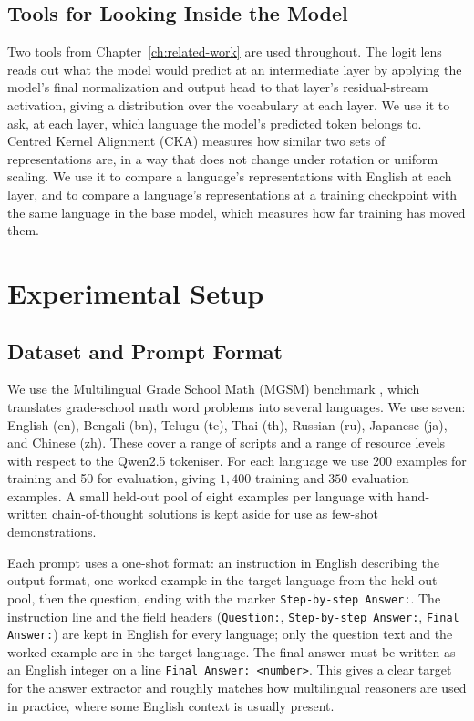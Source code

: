 \subsection{Tools for Looking Inside the Model}
\label{subsec:grpo-tools}

Two tools from Chapter~\ref{ch:related-work} are used throughout. The logit lens
\citep{nostalgebraist2020logitlens} reads out what the model would predict at an
intermediate layer by applying the model's final normalization and output head to
that layer's residual-stream activation, giving a distribution over the vocabulary
at each layer. We use it to ask, at each layer, which language the model's predicted
token belongs to. Centred Kernel Alignment (CKA)
\citep{kornblith2019similarity} measures how similar two sets of representations are,
in a way that does not change under rotation or uniform scaling. We use it to compare
a language's representations with English at each layer, and to compare a language's
representations at a training checkpoint with the same language in the base model,
which measures how far training has moved them.

\section{Experimental Setup}
\label{sec:grpo-setup}

\subsection{Dataset and Prompt Format}
\label{subsec:grpo-data}

We use the Multilingual Grade School Math (MGSM) benchmark \citep{shi2022mgsm},
which translates grade-school math word problems into several languages. We use
seven: English (en), Bengali (bn), Telugu (te), Thai (th), Russian (ru), Japanese
(ja), and Chinese (zh). These cover a range of scripts and a range of resource
levels with respect to the Qwen2.5 tokeniser. For each language we use 200 examples
for training and 50 for evaluation, giving $1{,}400$ training and $350$ evaluation
examples. A small held-out pool of eight examples per language with hand-written
chain-of-thought solutions is kept aside for use as few-shot demonstrations.

Each prompt uses a one-shot format: an instruction in English describing the output
format, one worked example in the target language from the held-out pool, then the
question, ending with the marker \texttt{Step-by-step Answer:}. The instruction line
and the field headers (\texttt{Question:}, \texttt{Step-by-step Answer:},
\texttt{Final Answer:}) are kept in English for every language; only the question
text and the worked example are in the target language. The final answer must be
written as an English integer on a line \texttt{Final Answer: <number>}. This gives
a clear target for the answer extractor and roughly matches how multilingual
reasoners are used in practice, where some English context is usually present.

